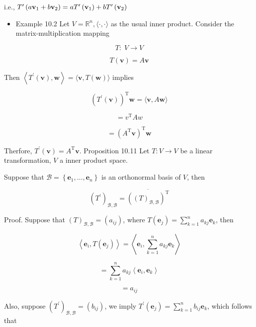 \documentclass[11pt]{article}
\begin{document}
i.e., \({T}^{\prime }\left( {a{\bf v}_1 + b{\bf v}_2}\right)  = a{T}^{\prime }\left( {\bf v}_1\right)  + b{T}^{\prime }\left( {\bf v}_2\right)\)

\begin{itemize}
\item Example 10.2 Let \(V = {\mathbb{R}}^n,\langle  \cdot  , \cdot  \rangle\) as the usual inner product. Consider the matrix-multiplication mapping
\end{itemize}

\[
T : \;V \rightarrow  V
\]

\[
T\left( \mathbf{v}\right)  = A\mathbf{v}
\]

Then \(\left\langle  {{T}^{\prime }\left( \mathbf{v}\right) ,\mathbf{w}}\right\rangle   = \langle \mathbf{v},T\left( \mathbf{w}\right) \rangle\) implies

\[
{\left( {T}^{\prime }\left( \mathbf{v}\right) \right) }^{\mathrm{T}}\mathbf{w} = \langle \mathbf{v},A\mathbf{w}\rangle
\]

\[
= {v}^{\mathrm{T}}{Aw}
\]

\[
= {\left( {A}^{\mathrm{T}}\mathbf{v}\right) }^{\mathrm{T}}\mathbf{w}
\]

Therfore, \({T}^{\prime }\left( \mathbf{v}\right)  = {A}^{\mathrm{T}}\mathbf{v}\). Proposition 10.11 Let \(T : V \rightarrow  V\) be a linear transformation, \(V\) a inner product space.

Suppose that \(\mathcal{B} = \left\{  {{\mathbf{e}}_1,\ldots ,{\mathbf{e}}_n}\right\}\) is an orthonormal basis of \(V\), then

\[
{\left( {T}^{\prime }\right) }_{\mathcal{B},\mathcal{B}} = \overline{{\left( {\left( T\right) }_{\mathcal{B},\mathcal{B}}\right) }^{\mathrm{T}}}
\]

Proof. Suppose that \({\left( T\right) }_{\mathcal{B},\mathcal{B}} = \left( {a}_{ij}\right)\), where \(T\left( {\mathbf{e}}_{j}\right)  = \mathop{\sum }\limits_{{k = 1}}^n{a}_{kj}{\mathbf{e}}_{k}\), then

\[
\left\langle  {{\mathbf{e}}_{i},T\left( {\mathbf{e}}_{j}\right) }\right\rangle   = \left\langle  {{\mathbf{e}}_{i},\mathop{\sum }\limits_{{k = 1}}^n{a}_{kj}{\mathbf{e}}_{k}}\right\rangle
\]

\[
= \mathop{\sum }\limits_{{k = 1}}^n{a}_{kj}\left\langle  {{\mathbf{e}}_{i},{\mathbf{e}}_{k}}\right\rangle
\]

\[
= {a}_{ij}
\]

Also, suppose \({\left( {T}^{\prime }\right) }_{\mathcal{B},\mathcal{B}} = \left( {b}_{ij}\right)\), we imply \({T}^{\prime }\left( {\mathbf{e}}_{j}\right)  = \mathop{\sum }\limits_{{k = 1}}^n{b}_{ij}{\mathbf{e}}_{k}\), which follows that
\end{document}
